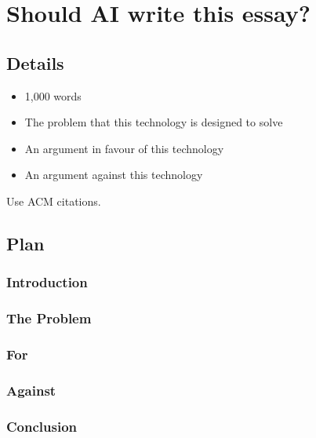 \chapter{Should AI write this essay?}
\section{Details}
\begin{itemize}
    \item 1,000 words
    \item The problem that this technology is designed to solve
    \item An argument in favour of this technology
    \item An argument against this technology
\end{itemize}
Use ACM citations.
\section{Plan}
\subsection{Introduction}
\subsection{The Problem}
\subsection{For}
\subsection{Against}
\subsection{Conclusion}
